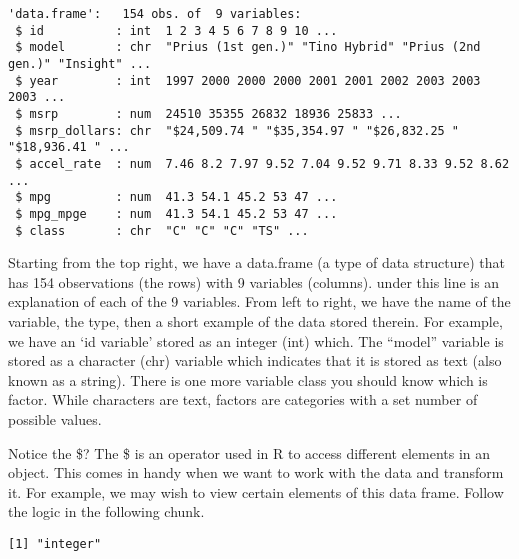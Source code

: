 \documentclass[
  letterpaper,
  DIV=11,
  numbers=noendperiod]{scrreprt}
\newenvironment{Shaded}{\begin{snugshade}}{\end{snugshade}}
\newcommand{\CommentTok}[1]{\textcolor[rgb]{0.37,0.37,0.37}{#1}}
\newcommand{\FunctionTok}[1]{\textcolor[rgb]{0.28,0.35,0.67}{#1}}
\newcommand{\NormalTok}[1]{\textcolor[rgb]{0.00,0.23,0.31}{#1}}
\newcommand{\OtherTok}[1]{\textcolor[rgb]{0.00,0.23,0.31}{#1}}
\newcommand{\SpecialCharTok}[1]{\textcolor[rgb]{0.37,0.37,0.37}{#1}}
\begin{document}
\begin{verbatim}
'data.frame':   154 obs. of  9 variables:
 $ id          : int  1 2 3 4 5 6 7 8 9 10 ...
 $ model       : chr  "Prius (1st gen.)" "Tino Hybrid" "Prius (2nd gen.)" "Insight" ...
 $ year        : int  1997 2000 2000 2000 2001 2001 2002 2003 2003 2003 ...
 $ msrp        : num  24510 35355 26832 18936 25833 ...
 $ msrp_dollars: chr  "$24,509.74 " "$35,354.97 " "$26,832.25 " "$18,936.41 " ...
 $ accel_rate  : num  7.46 8.2 7.97 9.52 7.04 9.52 9.71 8.33 9.52 8.62 ...
 $ mpg         : num  41.3 54.1 45.2 53 47 ...
 $ mpg_mpge    : num  41.3 54.1 45.2 53 47 ...
 $ class       : chr  "C" "C" "C" "TS" ...
\end{verbatim}

Starting from the top right, we have a data.frame (a type of data
structure) that has 154 observations (the rows) with 9 variables
(columns). under this line is an explanation of each of the 9 variables.
From left to right, we have the name of the variable, the type, then a
short example of the data stored therein. For example, we have an `id
variable' stored as an integer (int) which. The ``model'' variable is
stored as a character (chr) variable which indicates that it is stored
as text (also known as a string). There is one more variable class you
should know which is factor. While characters are text, factors are
categories with a set number of possible values.

Notice the \$? The \$ is an operator used in R to access different
elements in an object. This comes in handy when we want to work with the
data and transform it. For example, we may wish to view certain elements
of this data frame. Follow the logic in the following chunk.

\begin{Shaded}
\end{Shaded}

\begin{verbatim}
[1] "integer"
\end{verbatim}

\begin{Shaded}
\end{Shaded}
\end{document}
